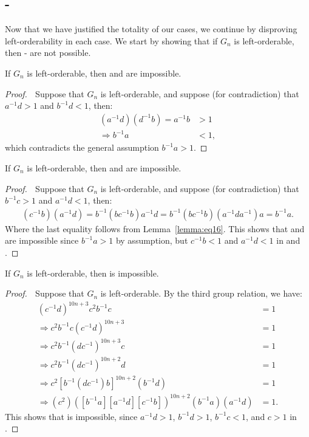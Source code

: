 \subsection{-}

Now that we have justified the totality of our cases, we continue by disproving left-orderability in each case. We start by showing that if $G_n$ is left-orderable, then - are not possible.


\begin{proposition} If $G_n$ is left-orderable, then  and  are impossible.
\end{proposition}
\begin{proof} $\;$ Suppose that $G_n$ is left-orderable, and suppose (for contradiction) that $a^{-1}d>1$ and $b^{-1}d<1$, then:
\begin{align*}
(a^{-1}d)(d^{-1}b)=a^{-1}b&>1\\
\Rightarrow{}b^{-1}a&<1,
\end{align*}
which contradicts the general assumption $b^{-1}a>1$.
\end{proof}

\begin{proposition} If $G_n$ is left-orderable, then  and  are impossible.
\end{proposition}
\begin{proof} $\;$ Suppose that $G_n$ is left-orderable, and suppose (for contradiction) that $b^{-1}c>1$ and $a^{-1}d<1$, then:
\begin{align*}
(c^{-1}b)(a^{-1}d)=b^{-1}(bc^{-1}b)a^{-1}d=b^{-1}(bc^{-1}b)(a^{-1}da^{-1})a=b^{-1}a.
\end{align*}
Where the last equality follows from Lemma~\ref{lemma:eq16}. This shows that  and  are impossible since $b^{-1}a>1$ by assumption, but $c^{-1}b<1$ and $a^{-1}d<1$ in  and .
\end{proof}

\begin{proposition} If $G_n$ is left-orderable, then  is impossible.
\end{proposition}
\begin{proof} $\;$ Suppose that $G_n$ is left-orderable. By the third group relation, we have:
\begin{align}
(c^{-1}d)^{10n+3}c^2b^{-1}c&=1\nonumber{}\\
\Rightarrow{}c^2b^{-1}c(c^{-1}d)^{10n+3}&=1\nonumber{}\\
\Rightarrow{}c^2b^{-1}(dc^{-1})^{10n+3}c&=1\label{eq3:2}\\
\Rightarrow{}c^2b^{-1}(dc^{-1})^{10n+2}d&=1\nonumber{}\\
\Rightarrow{}c^2[b^{-1}(dc^{-1})b]^{10n+2}(b^{-1}d)&=1\label{eq3:3}\\
\Rightarrow{}(c^2)([b^{-1}a][a^{-1}d][c^{-1}b])^{10n+2}(b^{-1}a)(a^{-1}d)&=1.\nonumber{}
\end{align}
This shows that  is impossible, since $a^{-1}d>1$, $b^{-1}d>1$, $b^{-1}c<1$, and $c>1$ in .
\end{proof}

